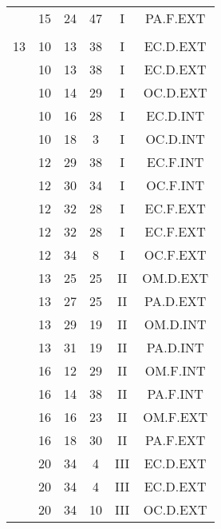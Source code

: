 \documentclass[12pt, a4paper]{article}
\begin{document}
\begin{multicols}{3}
{\begin{tabular}{c c c c c c}
	 	 	 	 & 15 & 24 & 47 & I & PA.F.EXT\\%
	 	 	 	 & & & & & \\%
	 	 	 	13 & 10 & 13 & 38 & I & EC.D.EXT\\%
	 	 	 	 & 10 & 13 & 38 & I & EC.D.EXT\\%
	 	 	 	 & 10 & 14 & 29 & I & OC.D.EXT\\%
	 	 	 	 & 10 & 16 & 28 & I & EC.D.INT\\%
	 	 	 	 & 10 & 18 & 3 & I & OC.D.INT\\%
	 	 	 	 & 12 & 29 & 38 & I & EC.F.INT\\%
	 	 	 	 & 12 & 30 & 34 & I & OC.F.INT\\%
	 	 	 	 & 12 & 32 & 28 & I & EC.F.EXT\\%
	 	 	 	 & 12 & 32 & 28 & I & EC.F.EXT\\%
	 	 	 	 & 12 & 34 & 8 & I & OC.F.EXT\\%
	 	 	 	 & 13 & 25 & 25 & II & OM.D.EXT\\%
	 	 	 	 & 13 & 27 & 25 & II & PA.D.EXT\\%
	 	 	 	 & 13 & 29 & 19 & II & OM.D.INT\\%
	 	 	 	 & 13 & 31 & 19 & II & PA.D.INT\\%
	 	 	 	 & 16 & 12 & 29 & II & OM.F.INT\\%
	 	 	 	 & 16 & 14 & 38 & II & PA.F.INT\\%
	 	 	 	 & 16 & 16 & 23 & II & OM.F.EXT\\%
	 	 	 	 & 16 & 18 & 30 & II & PA.F.EXT\\%
	 	 	 	 & 20 & 34 & 4 & III & EC.D.EXT\\%
	 	 	 	 & 20 & 34 & 4 & III & EC.D.EXT\\%
	 	 	 	 & 20 & 34 & 10 & III & OC.D.EXT\\%

\end{tabular}}
\end{multicols}
\end{document}
